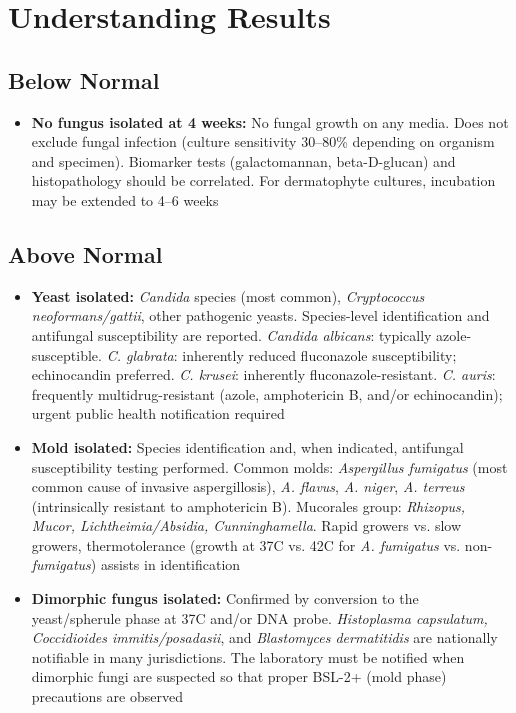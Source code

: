 \section*{Understanding Results}

\subsection*{Below Normal}
\begin{itemize}
  \item \textbf{No fungus isolated at 4 weeks:} No fungal growth on any media. Does not exclude fungal infection (culture sensitivity 30--80\% depending on organism and specimen). Biomarker tests (galactomannan, beta-D-glucan) and histopathology should be correlated. For dermatophyte cultures, incubation may be extended to 4--6 weeks
\end{itemize}

\subsection*{Above Normal}
\begin{itemize}
  \item \textbf{Yeast isolated:} \textit{Candida} species (most common), \textit{Cryptococcus neoformans/gattii}, other pathogenic yeasts. Species-level identification and antifungal susceptibility are reported. \textit{Candida albicans}: typically azole-susceptible. \textit{C. glabrata}: inherently reduced fluconazole susceptibility; echinocandin preferred. \textit{C. krusei}: inherently fluconazole-resistant. \textit{C. auris}: frequently multidrug-resistant (azole, amphotericin B, and/or echinocandin); urgent public health notification required
  \item \textbf{Mold isolated:} Species identification and, when indicated, antifungal susceptibility testing performed. Common molds: \textit{Aspergillus fumigatus} (most common cause of invasive aspergillosis), \textit{A. flavus}, \textit{A. niger}, \textit{A. terreus} (intrinsically resistant to amphotericin B). Mucorales group: \textit{Rhizopus, Mucor, Lichtheimia/Absidia, Cunninghamella}. Rapid growers vs. slow growers, thermotolerance (growth at 37\textdegree{}C vs. 42\textdegree{}C for \textit{A. fumigatus} vs. non-\textit{fumigatus}) assists in identification
  \item \textbf{Dimorphic fungus isolated:} Confirmed by conversion to the yeast/spherule phase at 37\textdegree{}C and/or DNA probe. \textit{Histoplasma capsulatum, Coccidioides immitis/posadasii}, and \textit{Blastomyces dermatitidis} are nationally notifiable in many jurisdictions. The laboratory must be notified when dimorphic fungi are suspected so that proper BSL-2+ (mold phase) precautions are observed
\end{itemize}

